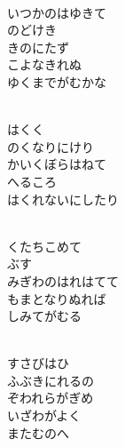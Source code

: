 \documentclass[10pt,b5j]{tarticle} %
\begin{document}
\begin{enumerate}
\begin{minipage}[c]{\blocksize}
    \end{minipage}
    \begin{minipage}[c]{\blocksize}
        
        \vspace{\linespace}
        \item~\\
        いつかのはゆきて\\
        のどけき\\
        きのにたず\\
        こよなきれぬ\\
        ゆくまでがむかな
        
        \vspace{\linespace}
        \item~\\
        はくく\\
        のくなりにけり\\
        かいくぼらはねて\\
        へるころ\\
        はくれないにしたり
        
        \vspace{\linespace}
        \item~\\
        くたちこめて\\
        ぶす\\
        みぎわのはれはてて\\
        もまとなりぬれば\\
        しみてがむる
        
    \end{minipage}
    \begin{minipage}[c]{\blocksize}
        
        \vspace{\linespace}
        \item~\\
        すさびはひ\\
        ふぶきにれるの\\
        ぞわれらがぎめ\\
        いざわがよく\\
        またむのへ
    

\end{minipage}
\end{enumerate}
\end{document}
